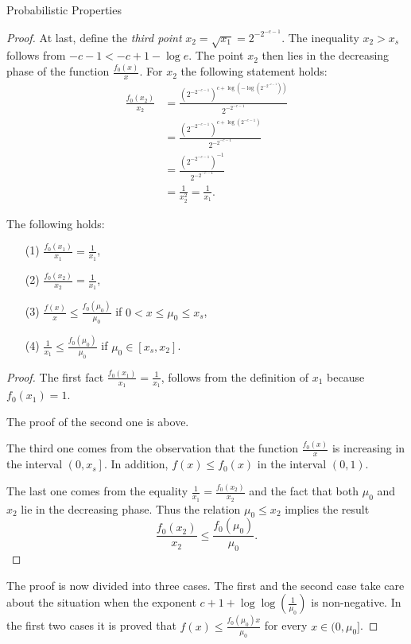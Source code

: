 \begin{section}{Probabilistic Properties}
\begin{proof}
At last, define the \emph{third point} $x_2 = \sqrt{x_1} = 2 ^ {-2 ^ {-c - 1}}$. The inequality $x_2 > x_s$ follows from $-c - 1 < -c + 1 - \log e$. The point $x_2$ then lies in the decreasing phase of the function $\frac{f_0(x)}{x}$. For $x_2$ the following statement holds:
\[
\begin{split}
\frac{f_0(x_2)}{x_2} 
	& = \frac{\left(2 ^ {-2 ^ {-c - 1}}\right) ^ {c + \log \left(- \log \left(2 ^ {-2 ^ {-c - 1}}\right)\right)}}{2 ^ {-2 ^ {-c - 1}}} \\
	& = \frac{\left(2 ^ {-2 ^ {-c - 1}}\right) ^ {c + \log \left(2 ^ {-c - 1}\right)}}{2 ^ {-2 ^ {-c - 1}}} \\
	& = \frac{\left(2 ^ {-2 ^ {-c - 1}}\right) ^ {-1}}{2 ^ {-2 ^ {-c - 1}}} \\
	& = \frac{1}{x_2^2} = \frac{1}{x_1} \text{.}
\end{split}
\]

\begin{claim}
\label{claim-use-me}
The following holds:
\begin{enumerate}
\item[(1)] $\frac{f_0(x_1)}{x_1} = \frac{1}{x_1}$,
\item[(2)] $\frac{f_0(x_2)}{x_2} = \frac{1}{x_1}$,
\item[(3)] $\frac{f(x)}{x} \leq \frac{f_0(\mu_0)}{\mu_0}$ if $0 < x \leq \mu_0 \leq x_s$,
\item[(4)] $\frac{1}{x_1} \leq \frac{f_0(\mu_0)}{\mu_0}$ if $\mu_0 \in \left[x_s, x_2 \right]$.
\end{enumerate}
\end{claim}
\begin{proof}
The first fact $\frac{f_0(x_1)}{x_1} = \frac{1}{x_1}$, follows from the definition of $x_1$ because $f_0(x_1) = 1$. 

The proof of the second one is above.

The third one comes from the observation that the function $\frac{f_0(x)}{x}$ is increasing in the interval $\left(0, x_s \right]$. In addition, $f(x) \leq f_0(x)$ in the interval $(0, 1)$.

The last one comes from the equality $\frac{1}{x_1} = \frac{f_0(x_2)}{x_2}$ and the fact that both $\mu_0$ and $x_2$ lie in the decreasing phase. Thus the relation $\mu_0 \leq x_2$ implies the result \[ \frac{f_0(x_2)}{x_2} \leq \frac{f_0(\mu_0)}{\mu_0} \text{.} \]
\end{proof}

The proof is now divided into three cases. The first and the second case take care about the situation when the exponent $c + 1 + \log \log \left(\frac{1}{\mu_0}\right)$ is non-negative. In the first two cases it is proved that $f(x) \leq \frac{f_0(\mu_0)x}{\mu_0}$ for every $x \in (0, \mu_0]$.

\end{proof}
\end{section}

